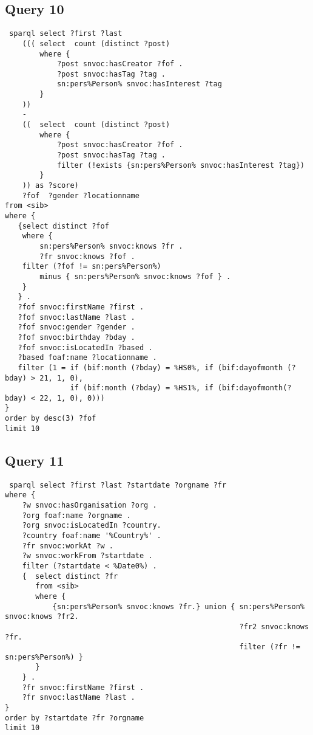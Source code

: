 \subsection{Query 10}
{\footnotesize
\begin{verbatim}
 sparql select ?first ?last 
    ((( select  count (distinct ?post)
        where {
            ?post snvoc:hasCreator ?fof .
            ?post snvoc:hasTag ?tag .
            sn:pers%Person% snvoc:hasInterest ?tag
        }
    ))
    -
    ((  select  count (distinct ?post)
        where {
            ?post snvoc:hasCreator ?fof .
            ?post snvoc:hasTag ?tag .
            filter (!exists {sn:pers%Person% snvoc:hasInterest ?tag})
        }
    )) as ?score)
    ?fof  ?gender ?locationname
from <sib>
where {
   {select distinct ?fof
    where {
        sn:pers%Person% snvoc:knows ?fr .
        ?fr snvoc:knows ?fof .
    filter (?fof != sn:pers%Person%)
        minus { sn:pers%Person% snvoc:knows ?fof } .
    }
   } .
   ?fof snvoc:firstName ?first .
   ?fof snvoc:lastName ?last .
   ?fof snvoc:gender ?gender .
   ?fof snvoc:birthday ?bday .
   ?fof snvoc:isLocatedIn ?based .
   ?based foaf:name ?locationname .
   filter (1 = if (bif:month (?bday) = %HS0%, if (bif:dayofmonth (?bday) > 21, 1, 0),
               if (bif:month (?bday) = %HS1%, if (bif:dayofmonth(?bday) < 22, 1, 0), 0)))
}
order by desc(3) ?fof
limit 10
\end{verbatim}
}

 

\subsection{Query 11}
{\footnotesize
\begin{verbatim}
 sparql select ?first ?last ?startdate ?orgname ?fr 
where {
    ?w snvoc:hasOrganisation ?org .
    ?org foaf:name ?orgname .
    ?org snvoc:isLocatedIn ?country.
    ?country foaf:name '%Country%' .
    ?fr snvoc:workAt ?w .
    ?w snvoc:workFrom ?startdate .
    filter (?startdate < %Date0%) .
    {  select distinct ?fr
       from <sib>
       where {
           {sn:pers%Person% snvoc:knows ?fr.} union { sn:pers%Person% snvoc:knows ?fr2.
                                                      ?fr2 snvoc:knows ?fr.
                                                      filter (?fr != sn:pers%Person%) }
       }
    } .
    ?fr snvoc:firstName ?first .
    ?fr snvoc:lastName ?last .
}
order by ?startdate ?fr ?orgname
limit 10
\end{verbatim}
}


